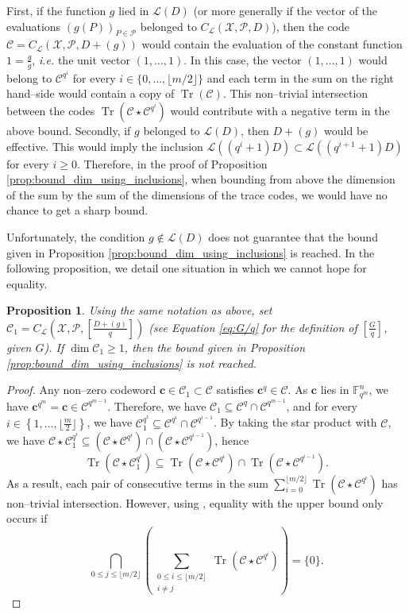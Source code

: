 \documentclass[peerreview]{IEEEtran}
\theoremstyle{plain}
\newtheorem{proposition}[thm]{Proposition}
\theoremstyle{definition}
\theoremstyle{remark}
\DeclareMathOperator{\trace}{Tr}
\newcommand{\calP}{\mathcal{P}}
\newcommand{\calL}{\mathcal{L}}
\newcommand{\calC}{\mathcal{C}}
\newcommand{\calX}{\mathcal{X}}
\newcommand{\fqm}{\mathbb{F}_{q^m}}
\newcommand{\Tr}[1]{\trace\!\left(#1\right)}
\newcommand{\set}[1]{\left\{#1\right\}}
\begin{document}
	First, if the function $g$ lied in $\calL(D)$ (or more generally if the vector of the evaluations $(g(P))_{P \in \calP}$ belonged to $C_\calL(\calX,\calP,D)$), then the code $\calC= C_{\calL}(\calX,\calP,D+(g))$ would contain the evaluation of the constant function $1=\frac{g}{g}$, \textit{i.e.} the unit vector $(1,\dots,1)$. In this case, the vector $(1,\dots,1)$ would belong to $\calC^{q^i}$ for every $i \in \{0,\dots, \lfloor{m/2} \rfloor\}$ and each term in the sum on the right hand--side would contain a copy of $\Tr{\calC}$. This non--trivial intersection between the codes $\Tr{\calC\star \calC^{q^i}}$ would contribute with a negative term in the above bound.
	Secondly, if $g$ belonged to $\calL(D)$, then $D+(g)$ would be effective. This would imply the inclusion $\calL((q^i+1)D) \subset \calL((q^{i+1}+1)D)$ for every $i \geq 0$. Therefore, in the proof of Proposition \ref{prop:bound_dim_using_inclusions}, when bounding from above the dimension of the sum by the sum of the dimensions of the trace codes, we would have no chance to get a sharp bound.
	
	Unfortunately, the condition $g \notin \calL(D)$ does not guarantee that the bound given in Proposition \ref{prop:bound_dim_using_inclusions} is reached. In the following proposition, we detail one situation in which we cannot hope for equality.
	
	\begin{proposition}\label{prop:non-eq}
		Using the same notation as above, set $\calC_1=C_{\calL}\left(\calX,\mathcal{P},\left[ \frac{D+(g)}{q} \right]\right)$ (see Equation \eqref{eq:G/q} for the definition of $\left[ \frac{G}{q} \right]$, given $G$). If $\dim \calC_1 \geq 1$, then the bound given in Proposition \ref{prop:bound_dim_using_inclusions} is not reached.
	\end{proposition}
	
	\begin{proof}
		Any non--zero codeword $\mathbf{c} \in  \calC_1 \subset \calC$ satisfies $\mathbf{c}^q \in \calC$. As $\mathbf{c}$ lies in $\fqm^n$, we have $\mathbf{c}^{q^m}=\mathbf{c} \in \calC^{q^{m-1}}$. Therefore,  we have $\calC_1 \subseteq \calC^{q} \cap \calC^{q^{m-1}}$, and for every $i \in \set{1,\dots,\lfloor \frac{m}{2}\rfloor}$, we have $\calC_1^{q^i} \subseteq \calC^{q^i} \cap \calC^{q^{i-1}}$. By taking the star product with $\calC$, we have $\calC \star \calC_1^{q^i} \subseteq \left(\calC \star  \calC^{q^i}\right) \cap \left(\calC \star  \calC^{q^{i-1}}\right)$, hence
		\[\Tr{\calC\star\calC_1^{q^i}} \subseteq \Tr{\calC\star\calC^{q^i}} \cap \Tr{\calC\star\calC^{q^{i-1}}}.\]
		As a result, each pair of consecutive terms in the sum $\sum\limits_{i=0}^{\lfloor m/2 \rfloor} \Tr{\calC \star \calC^{q^i}}$ has non--trivial intersection. However, using \cite[Theorem~2]{T19}, equality with the upper bound only occurs if
		\[\bigcap_{0\leq j \leq \lfloor m/2\rfloor} \left( \sum_{\substack{0\leq i \leq \lfloor m/2 \rfloor\\ i\neq j}} \Tr{\calC \star \calC^{q^i}} \right)= \{0\}.\]
	\end{proof}
	
\end{document}
